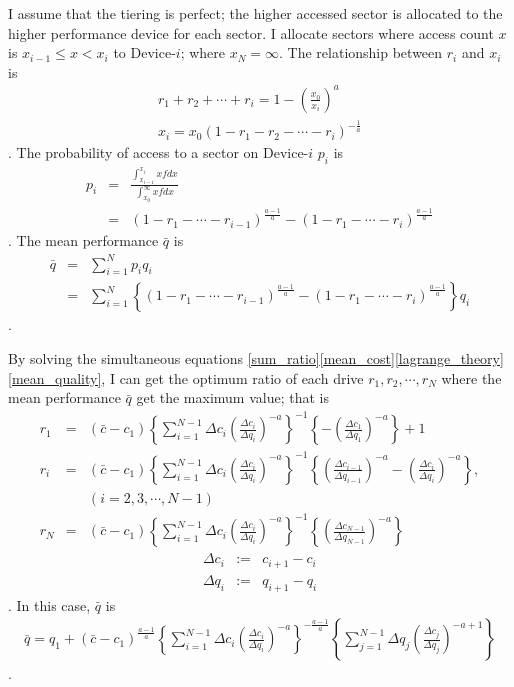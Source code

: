 \documentclass[a4paper,11pt]{article}
\begin{document}
I assume that the tiering is perfect; the higher accessed sector is allocated to the higher performance device for each sector. 
I allocate sectors where access count $x$ is $x_{i-1} \leq x < x_i$ to Device-$i$; where $x_N = \infty$.
The relationship between $r_i$ and $x_i$ is
\begin{eqnarray}
r_1+r_2+\cdots+r_i=1-\left(\frac{x_0}{x_i}\right)^a \\
x_i=x_0\left(1-r_1-r_2-\cdots-r_i\right)^{-\frac{1}{a}}
\end{eqnarray}
. The probability of access to a sector on Device-$i$ $p_i$ is
\begin{eqnarray}
p_i &=& \frac{\displaystyle{\int_{x_{i-1}}^{x_i} x f dx}}{\displaystyle{\int_{x_0}^{\infty} x f dx}} \nonumber\\
&=& \left(1-r_1-\cdots-r_{i-1}\right)^\frac{a-1}{a}
   -\left(1-r_1-\cdots-r_i\right)^\frac{a-1}{a} 
\end{eqnarray}
.
The mean performance $\bar{q}$ is
\begin{eqnarray}
\bar{q}&=&\sum_{i=1}^N p_i q_i \nonumber\\
&=&\sum_{i=1}^N \left\{ \left(1-r_1-\cdots-r_{i-1}\right)^\frac{a-1}{a}
                 -\left(1-r_1-\cdots-r_i    \right)^\frac{a-1}{a}
\right\} q_i \label{mean_quality}
\end{eqnarray}
.

By solving the simultaneous equations \eqref{sum_ratio}\eqref{mean_cost}\eqref{lagrange_theory}\eqref{mean_quality},
I can get the optimum ratio of each drive $r_1,r_2,\cdots,r_N$ where the mean performance $\bar{q}$ get the maximum value; that is 
\begin{eqnarray}
r_1&=&(\bar{c}-c_1)\left\{
    \sum_{i=1}^{N-1}\Delta c_i \left(\frac{\Delta c_i}{\Delta q_i}
    \right)^{-a}\right\}^{-1}
\left\{ 
-     \left(\frac{\Delta c_1}{\Delta q_1}
    \right)^{-a}
\right\}+1 \label{r1_c}\\
r_i&=&(\bar{c}-c_1)\left\{
    \sum_{i=1}^{N-1}\Delta c_i \left(\frac{\Delta c_i}{\Delta q_i}
    \right)^{-a}\right\}^{-1}
\left\{ 
     \left(\frac{\Delta c_{i-1}}{\Delta q_{i-1}}
    \right)^{-a}
-     \left(\frac{\Delta c_i}{\Delta q_i}
    \right)^{-a}
\right\}, \nonumber \\
&& (i = 2, 3, \cdots, N-1)\label{ri_c}\\
r_N&=&(\bar{c}-c_1)\left\{
    \sum_{i=1}^{N-1}\Delta c_i \left(\frac{\Delta c_i}{\Delta q_i}
    \right)^{-a}\right\}^{-1}
\left\{ 
    \left(\frac{\Delta c_{N-1}}{\Delta q_{N-1}}
    \right)^{-a}
\right\} \label{rN_c}
\end{eqnarray}
\begin{eqnarray}
\Delta c_i &:=& c_{i+1} - c_i \\
\Delta q_i &:=& q_{i+1} - q_i
\end{eqnarray}
. In this case, $\bar{q}$ is
\begin{eqnarray}
\bar{q} = q_1 + \left(\bar{c}-c_1\right)^\frac{a-1}{a}
\left\{\sum_{i=1}^{N-1} \Delta c_i
 \left(\frac{\Delta c_i}{\Delta q_i}\right)^{-a}
\right\}^{-\frac{a-1}{a}} 
\left\{\sum_{j=1}^{N-1}
 \Delta q_j  \left(\frac{\Delta c_j}{\Delta q_j}\right)^{-a+1}
\right\}
\end{eqnarray}
.
\end{document}

